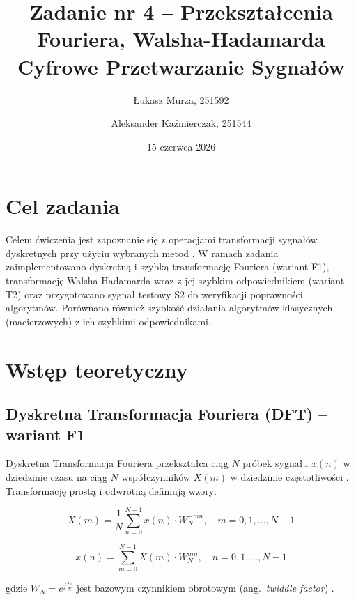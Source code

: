\documentclass[12pt]{article}
\title{{\bf Zadanie nr 4 -- Przekształcenia Fouriera, Walsha-Hadamarda}\linebreak
Cyfrowe Przetwarzanie Sygnałów}
\author{Łukasz Murza, 251592 \and Aleksander Kaźmierczak, 251544}
\date{15 czerwca 2026}
\begin{document}
\maketitle
\thispagestyle{empty}
\newpage
\setcounter{page}{1}

\section{Cel zadania}

Celem ćwiczenia jest zapoznanie się z operacjami transformacji sygnałów dyskretnych przy użyciu wybranych metod \cite{1}. W ramach zadania zaimplementowano dyskretną i szybką transformację Fouriera (wariant F1), transformację Walsha-Hadamarda wraz z jej szybkim odpowiednikiem (wariant T2) oraz przygotowano sygnał testowy S2 do weryfikacji poprawności algorytmów. Porównano również szybkość działania algorytmów klasycznych (macierzowych) z ich szybkimi odpowiednikami.

\section{Wstęp teoretyczny}

\subsection{Dyskretna Transformacja Fouriera (DFT) -- wariant F1}

Dyskretna Transformacja Fouriera przekształca ciąg $N$ próbek sygnału $x(n)$ w dziedzinie czasu na ciąg $N$ współczynników $X(m)$ w dziedzinie częstotliwości \cite{1}. Transformację prostą i odwrotną definiują wzory:

\begin{equation}
    X(m) = \frac{1}{N} \sum_{n=0}^{N-1} x(n) \cdot W_N^{-mn}, \quad m = 0, 1, \dots, N-1
    \label{eq:dft}
\end{equation}

\begin{equation}
    x(n) = \sum_{m=0}^{N-1} X(m) \cdot W_N^{mn}, \quad n = 0, 1, \dots, N-1
    \label{eq:idft}
\end{equation}

gdzie $W_N = e^{j \frac{2\pi}{N}}$ jest bazowym czynnikiem obrotowym (ang.~\textit{twiddle factor}) \cite{1}.
\end{document}
